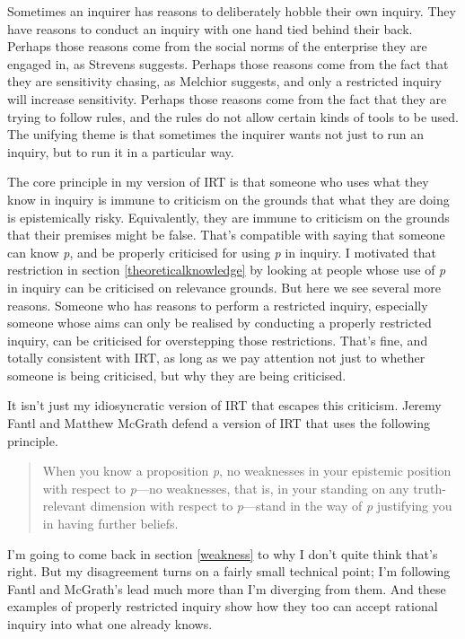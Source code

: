 \documentclass[
  11pt,
]{book}
\begin{document}
Sometimes an inquirer has reasons to deliberately hobble their own inquiry. They have reasons to conduct an inquiry with one hand tied behind their back. Perhaps those reasons come from the social norms of the enterprise they are engaged in, as Strevens suggests. Perhaps those reasons come from the fact that they are sensitivity chasing, as Melchior suggests, and only a restricted inquiry will increase sensitivity. Perhaps those reasons come from the fact that they are trying to follow rules, and the rules do not allow certain kinds of tools to be used. The unifying theme is that sometimes the inquirer wants not just to run an inquiry, but to run it in a particular way.

The core principle in my version of IRT is that someone who uses what they know in inquiry is immune to criticism on the grounds that what they are doing is epistemically risky. Equivalently, they are immune to criticism on the grounds that their premises might be false. That's compatible with saying that someone can know \emph{p}, and be properly criticised for using \emph{p} in inquiry. I motivated that restriction in section \ref{theoreticalknowledge} by looking at people whose use of \emph{p} in inquiry can be criticised on relevance grounds. But here we see several more reasons. Someone who has reasons to perform a restricted inquiry, especially someone whose aims can only be realised by conducting a properly restricted inquiry, can be criticised for overstepping those restrictions. That's fine, and totally consistent with IRT, as long as we pay attention not just to whether someone is being criticised, but why they are being criticised.

It isn't just my idiosyncratic version of IRT that escapes this criticism. Jeremy Fantl and Matthew McGrath defend a version of IRT that uses the following principle.

\begin{quote}
When you know a proposition \emph{p}, no weaknesses in your epistemic position with respect to \emph{p}---no weaknesses, that is, in your standing on any truth-relevant dimension with respect to \emph{p}---stand in the way of \emph{p} justifying you in having further beliefs. \citep[64]{FantlMcGrath2009}
\end{quote}

I'm going to come back in section \ref{weakness} to why I don't quite think that's right. But my disagreement turns on a fairly small technical point; I'm following Fantl and McGrath's lead much more than I'm diverging from them. And these examples of properly restricted inquiry show how they too can accept rational inquiry into what one already knows.
\end{document}
